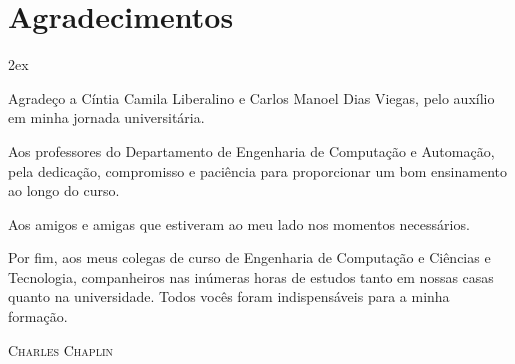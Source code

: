 %
%


\chapter*{Agradecimentos}
\thispagestyle{empty}

\begin{trivlist}  \itemsep 2ex

\item Agradeço a Cíntia Camila Liberalino e Carlos Manoel Dias Viegas, pelo auxílio em minha jornada universitária.
\item Aos professores do Departamento de Engenharia de Computação e Automação, pela dedicação, compromisso e paciência para proporcionar um bom ensinamento ao longo do curso. 
\item Aos amigos e amigas que estiveram ao meu lado nos momentos necessários.
\item Por fim, aos meus colegas de curso de Engenharia de Computação e Ciências e Tecnologia, companheiros nas inúmeras horas de estudos tanto em nossas casas quanto na universidade. Todos vocês foram indispensáveis para a minha formação.



\end{trivlist}

\newpage

\vspace*{\fill}
\setlength{\epigraphrule}{1pt}
\onehalfspacing
\setlength{\epigraphwidth}{.95\textwidth}

\begin{epigraphs}
{\textsc{Charles Chaplin}}
\end{epigraphs}



\vspace*{\fill}
